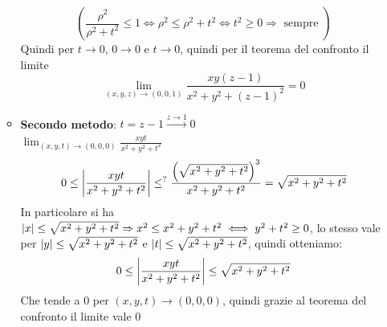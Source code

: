 \begin{eexercise}
\begin{enumerate}
\begin{itemize}
                      $$\left(\frac{\rho^2}{\rho^2+t^2} \leq 1 \iff \rho^2 \leq \rho^2+t^2 \iff t^2 \geq 0 \Rightarrow \text{ sempre }\right)$$
                      Quindi per $t \to 0$, $0 \to 0$ e $t \to 0$, quindi per il teorema del confronto il limite 
                      $$\lim_{(x,y,z)\to (0,0,1)} \frac{xy(z-1)}{x^2+y^2+(z-1)^2} = 0$$
                \item \textbf{Secondo metodo}: $t = z-1 \xrightarrow[]{z\to 1} 0$ \\
                      $\lim_{(x,y,t)\to (0,0,0)} \frac{xyt}{x^2+y^2+t^2}$
                      $$0 \leq \left\lvert \frac{xyt}{x^2+y^2+t^2} \right\rvert \leq^{?} \frac{\left(\sqrt{x^2+y^2+t^2}\right)^3}{x^2+y^2+t^2} = \sqrt{x^2+y^2+t^2}$$
                      In particolare si ha $\left\lvert x \right\rvert \leq \sqrt{x^2+y^2+t^2} \Rightarrow x^2 \leq x^2+y^2+t^2 \iff y^2+t^2 \geq 0$, lo stesso vale per 
                      $\left\lvert y \right\rvert \leq \sqrt{x^2+y^2+t^2}$ e $\left\lvert t \right\rvert \leq \sqrt{x^2+y^2+t^2}$, quindi otteniamo:
                      $$0 \leq \left\lvert \frac{xyt}{x^2+y^2+t^2} \right\rvert \leq \sqrt{x^2+y^2+t^2}$$
                      Che tende a 0 per $(x,y,t)\to (0,0,0)$, quindi grazie al teorema del confronto il limite vale 0
              \end{itemize}
  \end{enumerate}
\end{eexercise}
